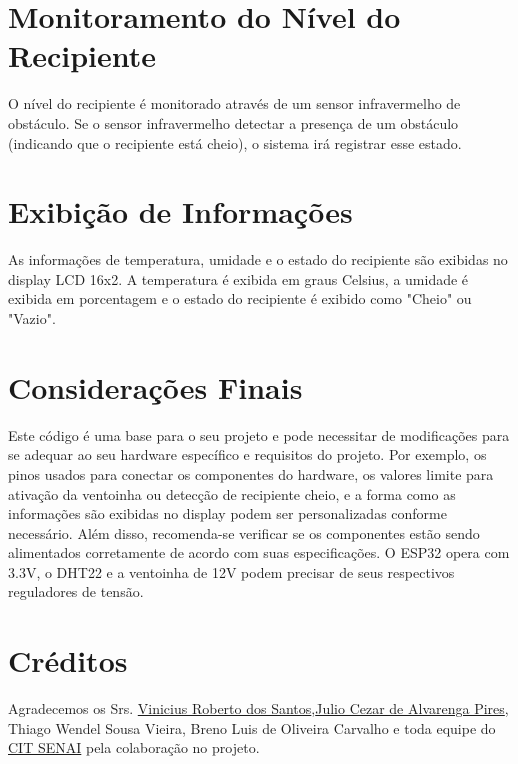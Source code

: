 \documentclass{article}
\begin{document}
\section{Monitoramento do Nível do Recipiente}
O nível do recipiente é monitorado através de um sensor infravermelho de obstáculo. Se o sensor infravermelho detectar a presença de um obstáculo (indicando que o recipiente está cheio), o sistema irá registrar esse estado.
\section{Exibição de Informações}
As informações de temperatura, umidade e o estado do recipiente são exibidas no display LCD 16x2. A temperatura é exibida em graus Celsius, a umidade é exibida em porcentagem e o estado do recipiente é exibido como "Cheio" ou "Vazio".
\section{Considerações Finais}
Este código é uma base para o seu projeto e pode necessitar de modificações para se adequar ao seu hardware específico e requisitos do projeto. Por exemplo, os pinos usados para conectar os componentes do hardware, os valores limite para ativação da ventoinha ou detecção de recipiente cheio, e a forma como as informações são exibidas no display podem ser personalizadas conforme necessário. Além disso, recomenda-se verificar se os componentes estão sendo alimentados corretamente de acordo com suas especificações. O ESP32 opera com 3.3V, o DHT22 e a ventoinha de 12V podem precisar de seus respectivos reguladores de tensão.
\section{Créditos}
Agradecemos os Srs. \href{https://www.linkedin.com/in/vin\%C3\%ADcius-roberto-dos-santos-03a84619a/}{Vinicius Roberto dos Santos},\href{https://www.linkedin.com/in/j\%C3\%BAlio-pires-materiais-soldagem/}{Julio Cezar de Alvarenga Pires}, Thiago Wendel Sousa Vieira, Breno Luis de Oliveira Carvalho e toda equipe do \href{https://www7.fiemg.com.br/cit}{CIT SENAI} pela colaboração no projeto.
\end{document}
